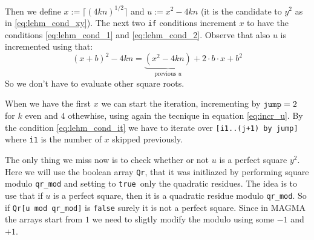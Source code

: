 \documentclass{article}
\theoremstyle{plain}
\theoremstyle{remark}
\theoremstyle{definition}
\begin{document}
Then we define $x := \lceil (4kn)^{1/2}\rceil $ and $ u := x^2 - 4kn$ (it is the candidate to $y^2$ as in \ref{eq:lehm_cond_xy}). The next two \texttt{if} conditions increment $x$ to have the conditions \ref{eq:lehm_cond_1} and \ref{eq:lehm_cond_2}. Observe that also $u$ is incremented using that:
\begin{equation}
	\label{eq:incr_u}
	(x+b)^2 - 4kn = \underbrace{(x^2 - 4kn)}_{\text{previous }u} + 2\cdot b \cdot x + b^2
\end{equation}
So we don't have to evaluate other square roots. 

When we have the first $x$ we can start the iteration, incrementing by $\verb|jump| = 2$ for $k$ even and $4$ othewhise, using again the tecnique in equation \ref{eq:incr_u}. By the condition \ref{eq:lehm_cond_it} we have to iterate over \verb|[i1..(j+1) by jump]| where \verb|i1| is the number of $x$ skipped previously. 

The only thing we miss now is to check whether or not $u$ is a perfect square $y^2$. Here we will use the boolean array \texttt{Qr}, 
that it was initliazed by performing square modulo \verb|qr_mod| and setting to \texttt{true} only the quadratic residues. 
The idea is to use that if $u$ is a perfect square, then it is a quadratic residue modulo \verb|qr_mod|. 
So if \verb|Qr[u mod qr_mod]| is \texttt{false} surely it is not a perfect square. 
Since in MAGMA the arrays start from $1$ we need to sligtly modify the modulo using some $-1$ and $+1$. 


\newpage
\printbibliography
\end{document}
